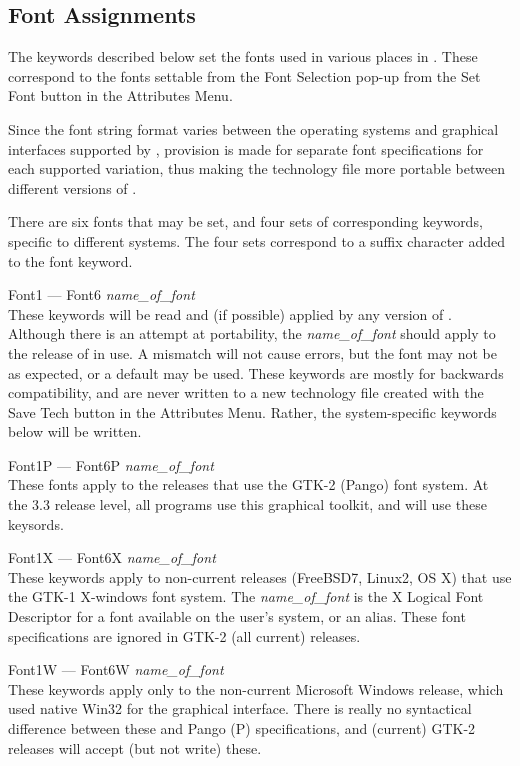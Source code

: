 \subsection{Font Assignments}

The keywords described below set the fonts used in various places in
{\Xic}.  These correspond to the fonts settable from the {\cb Font
Selection} pop-up from the {\cb Set Font} button in the {\cb
Attributes Menu}.

Since the font string format varies between the operating systems and
graphical interfaces supported by {\Xic}, provision is made for
separate font specifications for each supported variation, thus making
the technology file more portable between different versions of
{\Xic}.

There are six fonts that may be set, and four sets of corresponding
keywords, specific to different systems.  The four sets correspond to
a suffix character added to the font keyword.

\begin{description}
\item{\vt Font1 --- Font6} {\it name\_of\_font}\\
These keywords will be read and (if possible) applied by any version
of {\Xic}.  Although there is an attempt at portability, the {\it
name\_of\_font} should apply to the release of {\Xic} in use.  A
mismatch will not cause errors, but the font may not be as expected,
or a default may be used.  These keywords are mostly for backwards
compatibility, and are never written to a new technology file created
with the {\cb Save Tech} button in the {\cb Attributes Menu}.  Rather,
the system-specific keywords below will be written.

\item{\vt Font1P --- Font6P} {\it name\_of\_font}\\
These fonts apply to the releases that use the GTK-2 (Pango) font
system.  At the 3.3 release level, all {\XicTools} programs use this
graphical toolkit, and will use these keysords.

\item{\vt Font1X --- Font6X} {\it name\_of\_font}\\
These keywords apply to non-current releases (FreeBSD7, Linux2, OS X)
that use the GTK-1 X-windows font system.  The {\it name\_of\_font} is
the X Logical Font Descriptor for a font available on the user's
system, or an alias.  These font specifications are ignored in GTK-2
(all current) releases.

\item{\vt Font1W --- Font6W} {\it name\_of\_font}\\
These keywords apply only to the non-current Microsoft Windows
release, which used native Win32 for the graphical interface.  There
is really no syntactical difference between these and Pango ({\vt P})
specifications, and (current) GTK-2 releases will accept (but not
write) these.
\end{description}

